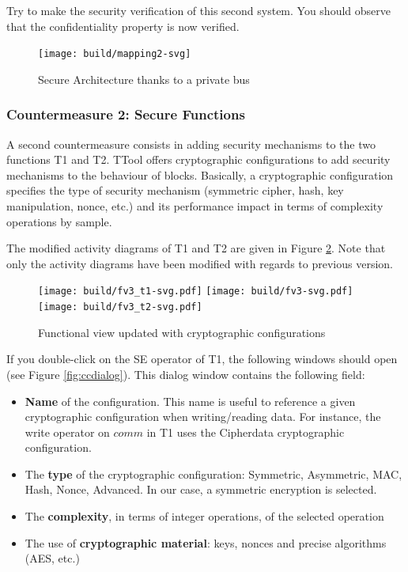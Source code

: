 \documentclass[12pt]{article}
\begin{document}
Try to make the security verification of this second system. You should observe that the confidentiality property is now verified.

\begin{figure}[htbp]
\centering
\texttt{[image: build/mapping2-svg]}
\caption{Secure Architecture thanks to a private bus} \label{fig:mapping2}
\end{figure}

\subsubsection{Countermeasure 2: Secure Functions}
A second countermeasure consists in adding security mechanisms to the two functions T1 and T2. TTool offers cryptographic configurations to add security mechanisms to the behaviour of blocks. Basically, a cryptographic configuration specifies the type of security mechanism (symmetric cipher, hash, key manipulation, nonce, etc.) and its performance impact in terms of complexity operations by sample.

The modified activity diagrams of T1 and T2 are given in Figure \ref{fig:fv3}. Note that only the activity diagrams have been modified with regards to previous version.

\begin{figure}[htbp]
\centering
\texttt{[image: build/fv3\_t1-svg.pdf]}
\texttt{[image: build/fv3-svg.pdf]}
\texttt{[image: build/fv3\_t2-svg.pdf]}
\caption{Functional view updated with cryptographic configurations} \label{fig:fv3}
\end{figure}

If you double-click on the SE operator of T1, the following windows should open (see Figure \ref{fig:ccdialog}). This dialog window contains the following field:
\begin{itemize}
\item \textbf{Name} of the configuration. This name is useful to reference a given cryptographic configuration when writing/reading data. For instance, the write operator on $comm$ in T1 uses the Cipherdata cryptographic configuration.
\item The \textbf{type} of the cryptographic configuration: Symmetric, Asymmetric, MAC, Hash, Nonce, Advanced. In our case, a symmetric encryption is selected.
\item The \textbf{complexity}, in terms of integer operations, of the selected operation
\item The use of \textbf{cryptographic material}: keys, nonces and precise algorithms (AES, etc.)
\end{itemize}
\end{document}
